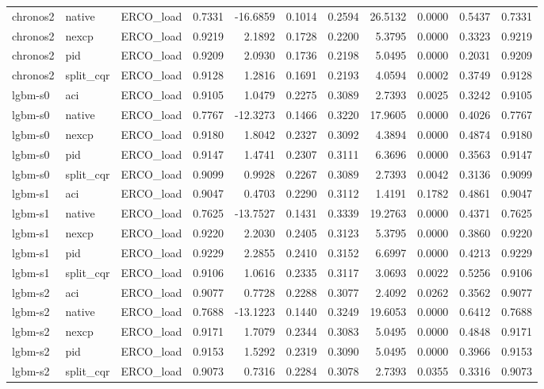 \begin{tabular}{lllrrrrrrrr}
chronos2 & native & ERCO_load & 0.7331 & -16.6859 & 0.1014 & 0.2594 & 26.5132 & 0.0000 & 0.5437 & 0.7331 \\
chronos2 & nexcp & ERCO_load & 0.9219 & 2.1892 & 0.1728 & 0.2200 & 5.3795 & 0.0000 & 0.3323 & 0.9219 \\
chronos2 & pid & ERCO_load & 0.9209 & 2.0930 & 0.1736 & 0.2198 & 5.0495 & 0.0000 & 0.2031 & 0.9209 \\
chronos2 & split_cqr & ERCO_load & 0.9128 & 1.2816 & 0.1691 & 0.2193 & 4.0594 & 0.0002 & 0.3749 & 0.9128 \\
lgbm-s0 & aci & ERCO_load & 0.9105 & 1.0479 & 0.2275 & 0.3089 & 2.7393 & 0.0025 & 0.3242 & 0.9105 \\
lgbm-s0 & native & ERCO_load & 0.7767 & -12.3273 & 0.1466 & 0.3220 & 17.9605 & 0.0000 & 0.4026 & 0.7767 \\
lgbm-s0 & nexcp & ERCO_load & 0.9180 & 1.8042 & 0.2327 & 0.3092 & 4.3894 & 0.0000 & 0.4874 & 0.9180 \\
lgbm-s0 & pid & ERCO_load & 0.9147 & 1.4741 & 0.2307 & 0.3111 & 6.3696 & 0.0000 & 0.3563 & 0.9147 \\
lgbm-s0 & split_cqr & ERCO_load & 0.9099 & 0.9928 & 0.2267 & 0.3089 & 2.7393 & 0.0042 & 0.3136 & 0.9099 \\
lgbm-s1 & aci & ERCO_load & 0.9047 & 0.4703 & 0.2290 & 0.3112 & 1.4191 & 0.1782 & 0.4861 & 0.9047 \\
lgbm-s1 & native & ERCO_load & 0.7625 & -13.7527 & 0.1431 & 0.3339 & 19.2763 & 0.0000 & 0.4371 & 0.7625 \\
lgbm-s1 & nexcp & ERCO_load & 0.9220 & 2.2030 & 0.2405 & 0.3123 & 5.3795 & 0.0000 & 0.3860 & 0.9220 \\
lgbm-s1 & pid & ERCO_load & 0.9229 & 2.2855 & 0.2410 & 0.3152 & 6.6997 & 0.0000 & 0.4213 & 0.9229 \\
lgbm-s1 & split_cqr & ERCO_load & 0.9106 & 1.0616 & 0.2335 & 0.3117 & 3.0693 & 0.0022 & 0.5256 & 0.9106 \\
lgbm-s2 & aci & ERCO_load & 0.9077 & 0.7728 & 0.2288 & 0.3077 & 2.4092 & 0.0262 & 0.3562 & 0.9077 \\
lgbm-s2 & native & ERCO_load & 0.7688 & -13.1223 & 0.1440 & 0.3249 & 19.6053 & 0.0000 & 0.6412 & 0.7688 \\
lgbm-s2 & nexcp & ERCO_load & 0.9171 & 1.7079 & 0.2344 & 0.3083 & 5.0495 & 0.0000 & 0.4848 & 0.9171 \\
lgbm-s2 & pid & ERCO_load & 0.9153 & 1.5292 & 0.2319 & 0.3090 & 5.0495 & 0.0000 & 0.3966 & 0.9153 \\
lgbm-s2 & split_cqr & ERCO_load & 0.9073 & 0.7316 & 0.2284 & 0.3078 & 2.7393 & 0.0355 & 0.3316 & 0.9073 \\

\end{tabular}

